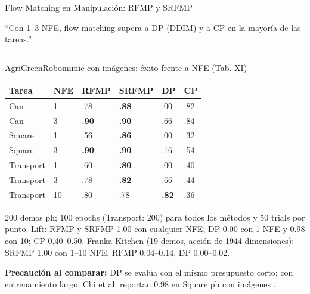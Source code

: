 \documentclass[aspectratio=169,10pt,xcolor={dvipsnames,table}]{beamer}
\newcommand{\BannerFont}{\fontsize{7.5}{9.2}\selectfont\bfseries}       %
\newcommand{\FootnoteFont}{\fontsize{5}{6.2}\selectfont}                %
\newcommand{\BannerArc}{1.5pt}             %
\newcommand{\BannerRule}{0.5pt}            %
\newcommand{\BannerLeftRule}{2.5pt}        %
\newcommand{\CardHeightTall}{46mm}         %
\newcommand{\BannerCentral}[2][UCNCyan]{%
  \begin{tcolorbox}[
    enhanced,
    colback=#1!10,
    colframe=#1,
    boxrule=\BannerRule,
    leftrule=\BannerLeftRule,
    arc=\BannerArc,
    top=0.35mm, bottom=0.35mm, left=2mm, right=2mm
  ]
    {\BannerFont\raggedright\textcolor{UCNBlue}{#2}\par}
  \end{tcolorbox}%
  \vspace{-2.5mm}%
}
\newcommand{\RefNote}[1]{{\FootnoteFont\textcolor{TextDark!65}{\cite{#1}}}}
\newcommand{\BannerRef}[1]{{\mdseries\fontsize{5}{6}\selectfont\textcolor{TextDark!65}{\cite{#1}}}} %
\newcommand{\TabFont}{\fontsize{5.3}{6.4}\selectfont}                    %
\begin{document}
\begin{frame}{Flow Matching en Manipulación: RFMP y SRFMP}
  \BannerCentral[AgriGreen]{``Con 1--3 NFE, flow matching supera a DP (DDIM) y a CP en la mayoría de las tareas.'' \BannerRef{ding2025rfmp}}
  \vspace{0.8mm}
  \begin{columns}[T, onlytextwidth]
    \begin{column}{0.55\textwidth}
      \begin{Card}[height=\CardHeightTall]{AgriGreen}{Robomimic con imágenes: éxito frente a NFE (Tab. XI)}
        {\TabFont
        \setlength{\tabcolsep}{1.4pt}
        \renewcommand{\arraystretch}{1.0}
        \begin{tabular}{@{}L{15mm} C{8mm} *{4}{C{11mm}}@{}}
          \toprule
          \textbf{Tarea} & \textbf{NFE} & \textbf{RFMP} & \textbf{SRFMP} & \textbf{DP} & \textbf{CP} \\
          \midrule
          Can & 1 & .78 & \textbf{.88} & .00 & .82 \\
          Can & 3 & \textbf{.90} & \textbf{.90} & .66 & .84 \\
          Square & 1 & .56 & \textbf{.86} & .00 & .32 \\
          Square & 3 & \textbf{.90} & \textbf{.90} & .16 & .54 \\
          Transport & 1 & .60 & \textbf{.80} & .00 & .40 \\
          Transport & 3 & .78 & \textbf{.82} & .66 & .44 \\
          Transport & 10 & .80 & .78 & \textbf{.82} & .36 \\
          \bottomrule
        \end{tabular}\par
        \vspace{1mm}
        \textcolor{TextDark!80}{200 demos ph; 100 epochs (Transport: 200) para todos los métodos y 50 trials por punto. Lift: RFMP y SRFMP 1.00 con cualquier NFE; DP 0.00 con 1 NFE y 0.98 con 10; CP 0.40--0.50. Franka Kitchen (19 demos, acción de 1944 dimensiones): SRFMP 1.00 con 1--10 NFE, RFMP 0.04--0.14, DP 0.00--0.02.}\par
        \vspace{0.6mm}
        \textcolor{UCNTerracotta}{\textbf{Precaución al comparar:}} \textcolor{TextDark!80}{DP se evalúa con el mismo presupuesto corto; con entrenamiento largo, Chi et al. reportan 0.98 en Square ph con imágenes \RefNote{chi2025diffusion}.}\par}

\end{Card}
\end{column}
\end{columns}
\end{frame}
\end{document}
